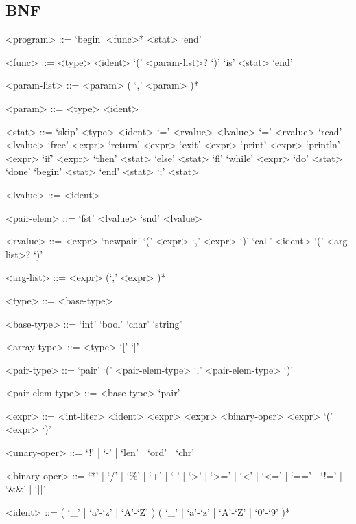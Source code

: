 \documentclass[a4paper]{article}
\theoremstyle{definition}
\begin{document}
\subsection{BNF}
\begin{grammar}
  <program> ::= `begin' <func>* <stat> `end'

  <func> ::= <type> <ident> `(' <param-list>? `)' `is' <stat> `end'

  <param-list> ::= <param> ( `,' <param> )*

  <param> ::= <type> <ident>

  <stat>  ::= `skip'
    \alt <type> <ident> `=' <rvalue>
    \alt <lvalue> `=' <rvalue>
    \alt `read' <lvalue>
    \alt `free' <expr>
    \alt `return' <expr>
    \alt `exit' <expr>
    \alt `print' <expr>
    \alt `println' <expr>
    \alt `if' <expr> `then' <stat> `else' <stat> `fi'
    \alt `while' <expr> `do' <stat> `done'
    \alt `begin' <stat> `end'
    \alt <stat> `;' <stat>

  <lvalue> ::= <ident>

  <pair-elem> ::= `fst' <lvalue>
    \alt `snd' <lvalue>

  <rvalue> ::= <expr>
    \alt `newpair' `(' <expr> `,' <expr> `)'
    \alt `call' <ident> `(' <arg-list>? `)'

  <arg-list> ::= <expr> (`,' <expr> )*

  <type> ::= <base-type>

  <base-type> ::= `int'
    \alt `bool'
    \alt `char'
    \alt `string'

  <array-type> ::= <type> `[' `]'

  <pair-type> ::= `pair' `(' <pair-elem-type> `,' <pair-elem-type> `)'

  <pair-elem-type> ::= <base-type>
    \alt `pair'

  <expr> ::= <int-liter>
    \alt <ident>
     <expr>
    \alt <expr> <binary-oper> <expr>
    \alt `(' <expr> `)'

  <unary-oper> ::= `!' | `-' | `len' | `ord' | `chr'

  <binary-oper> ::= `*' | `/' | `\%' | `+' | `-' | `>' | `>=' | `<' | `<=' | `==' | `!=' | `&&' | `||'

  <ident> ::= ( `\_' | `a'-`z' | `A'-`Z' ) ( `\_' | `a'-`z' | `A'-`Z' | `0'-`9' )*


\end{grammar}
\end{document}
